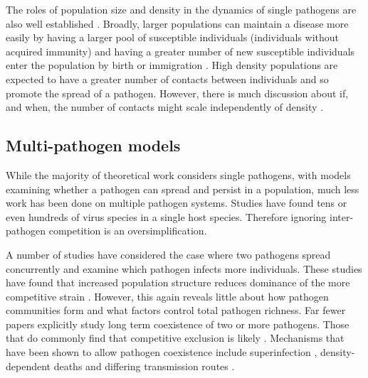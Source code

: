 The roles of population size and density in the dynamics of single pathogens are also well established \cite{may1979population, anderson1979population, heesterbeek2002brief, lloyd2005should}.
Broadly, larger populations can maintain a disease more easily by having a larger pool of susceptible individuals (individuals without acquired immunity) and having a greater number of new susceptible individuals enter the population by birth or immigration \cite{may1979population, anderson1979population}.
High density populations are expected to have a greater number of contacts between individuals and so promote the spread of a pathogen.
However, there is much discussion about if, and when, the number of contacts might scale independently of density \cite{mccallum2001should}.

\subsection{Multi-pathogen models}
While the majority of theoretical work considers single pathogens, with models examining whether a pathogen can spread and persist in a population, much less work has been done on multiple pathogen systems.
Studies have found tens \cite{anthony2013strategy} or even hundreds \cite{anthony2015non} of virus species in a single host species.
Therefore ignoring inter-pathogen competition is an oversimplification.

A number of studies have considered the case where two pathogens spread concurrently and examine which pathogen infects more individuals.
These studies have found that increased population structure reduces dominance of the more competitive strain \cite{van2014domination, poletto2013host, poletto2015characterising}.
However, this again reveals little about how pathogen communities form and what factors control total pathogen richness.
Far fewer papers explicitly study long term coexistence of two or more pathogens.
Those that do commonly find that competitive exclusion is likely \cite{castillo1995dynamics, bremermann1989competitive, martcheva2013competitive, ackleh2003competitive, ackleh2014robust, turner2002impact}.
Mechanisms that have been shown to allow pathogen coexistence include superinfection \cite{may1994superinfection, li2010age}, density-dependent deaths \cite{ackleh2003competitive, kirupaharan2004coexistence} and differing transmission routes \cite{allen2003dynamics}.

